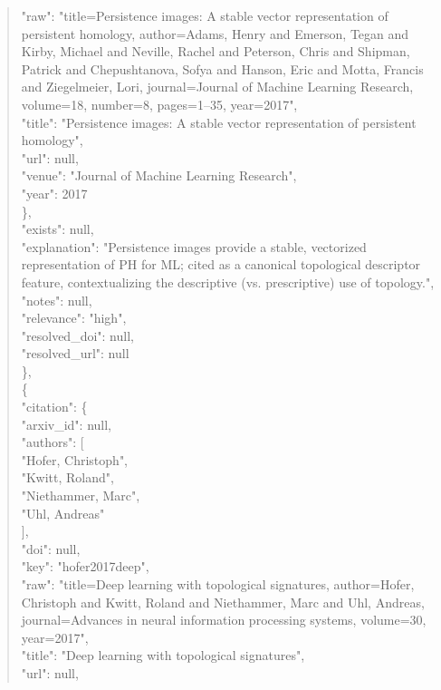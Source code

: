 \documentclass[11pt]{article}
\begin{document}
\begin{quote}
        "raw": "title=Persistence images: A stable vector representation of persistent homology, author=Adams, Henry and Emerson, Tegan and Kirby, Michael and Neville, Rachel and Peterson, Chris and Shipman, Patrick and Chepushtanova, Sofya and Hanson, Eric and Motta, Francis and Ziegelmeier, Lori, journal=Journal of Machine Learning Research, volume=18, number=8, pages=1--35, year=2017",\\
        "title": "Persistence images: A stable vector representation of persistent homology",\\
        "url": null,\\
        "venue": "Journal of Machine Learning Research",\\
        "year": 2017\\
      \},\\
      "exists": null,\\
      "explanation": "Persistence images provide a stable, vectorized representation of PH for ML; cited as a canonical topological descriptor feature, contextualizing the descriptive (vs. prescriptive) use of topology.",\\
      "notes": null,\\
      "relevance": "high",\\
      "resolved\_doi": null,\\
      "resolved\_url": null\\
    \},\\
    \{\\
      "citation": \{\\
        "arxiv\_id": null,\\
        "authors": [\\
          "Hofer, Christoph",\\
          "Kwitt, Roland",\\
          "Niethammer, Marc",\\
          "Uhl, Andreas"\\
        ],\\
        "doi": null,\\
        "key": "hofer2017deep",\\
        "raw": "title=Deep learning with topological signatures, author=Hofer, Christoph and Kwitt, Roland and Niethammer, Marc and Uhl, Andreas, journal=Advances in neural information processing systems, volume=30, year=2017",\\
        "title": "Deep learning with topological signatures",\\
        "url": null,\\

\end{quote}
\end{document}
